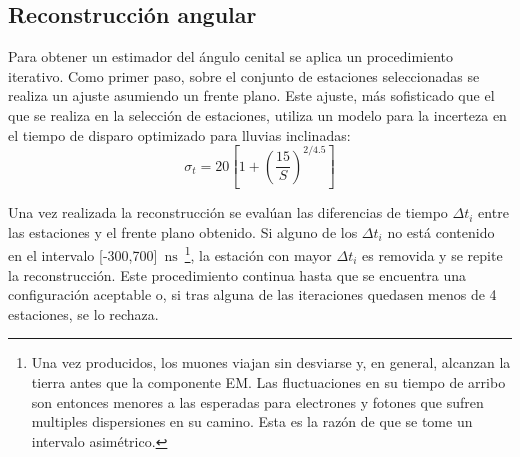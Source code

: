 	\subsection{Reconstrucción angular}
	\label{sbsc:thetaRec}
	
	Para obtener un estimador del ángulo cenital se aplica un procedimiento iterativo.
	Como primer paso, sobre el conjunto de estaciones seleccionadas se realiza un ajuste asumiendo un frente plano.
	Este ajuste, más sofisticado que el que se realiza en la selección de estaciones, utiliza un modelo para la incerteza en el tiempo de disparo \cite{cite:ines} optimizado para lluvias inclinadas:
	\begin{equation}
	\sigma_t = 20 \left[ 1 + \left( \frac{15}{S} \right)^{2/4.5} \right]
	\label{ec:varT} 
	\end{equation}

	

	Una vez realizada la reconstrucción se evalúan las diferencias de tiempo $\Delta t_i$ entre las estaciones y el frente plano obtenido.
	Si alguno de los $\Delta t_i$ no está contenido en el intervalo [-300,700]~$\mbox{ns}$~\footnote{
	Una vez producidos, los muones viajan sin desviarse y, en general, alcanzan la tierra antes que la componente EM. 
	Las fluctuaciones en su tiempo de arribo son entonces menores a las esperadas para electrones y fotones que sufren multiples dispersiones en su camino.
	Esta es la razón de que se tome un intervalo asimétrico.
	},
	la estación con mayor $\Delta t_i$ es removida y se repite la reconstrucción.
	Este procedimiento continua hasta que se encuentra una configuración aceptable o, si tras alguna de las iteraciones quedasen menos de 4 estaciones, se lo rechaza.
	
